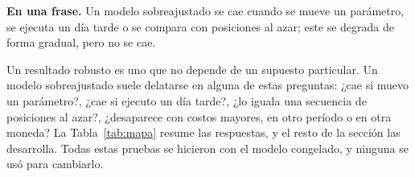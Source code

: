 \documentclass[10pt,a4paper]{article}
\begin{document}
\begin{ideaclave}
\textbf{En una frase.} Un modelo sobreajustado se cae cuando se mueve un parámetro, se
ejecuta un día tarde o se compara con posiciones al azar; este se degrada de forma
gradual, pero no se cae.
\end{ideaclave}

Un resultado robusto es uno que no depende de un supuesto particular. Un modelo
sobreajustado suele delatarse en alguna de estas preguntas: ¿cae si muevo un parámetro?,
¿cae si ejecuto un día tarde?, ¿lo iguala una secuencia de posiciones al azar?,
¿desaparece con costos mayores, en otro período o en otra moneda? La
Tabla~\ref{tab:mapa} resume las respuestas, y el resto de la sección las desarrolla.
Todas estas pruebas se hicieron con el modelo congelado, y ninguna se usó para cambiarlo.
\end{document}
